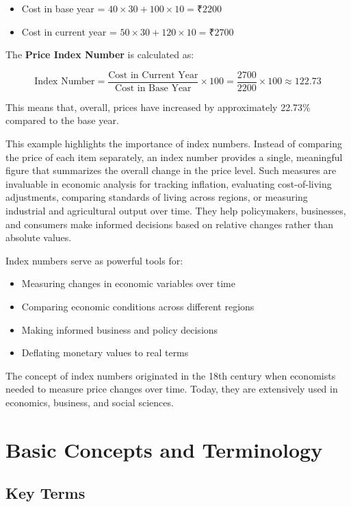 \documentclass[twoside]{book}
\begin{document}
\begin{itemize}
    \item Cost in base year = \( 40 \times 30 + 100 \times 10 = ₹2200 \)
    \item Cost in current year = \( 50 \times 30 + 120 \times 10 = ₹2700 \)
\end{itemize}

The \textbf{Price Index Number} is calculated as:

\[
\text{Index Number} = \frac{\text{Cost in Current Year}}{\text{Cost in Base Year}} \times 100 = \frac{2700}{2200} \times 100 \approx 122.73
\]

This means that, overall, prices have increased by approximately 22.73\% compared to the base year.

This example highlights the importance of index numbers. Instead of comparing the price of each item separately, an index number provides a single, meaningful figure that summarizes the overall change in the price level. Such measures are invaluable in economic analysis for tracking inflation, evaluating cost-of-living adjustments, comparing standards of living across regions, or measuring industrial and agricultural output over time. They help policymakers, businesses, and consumers make informed decisions based on relative changes rather than absolute values.

Index numbers serve as powerful tools for:
\begin{itemize}
    \item Measuring changes in economic variables over time
    \item Comparing economic conditions across different regions
    \item Making informed business and policy decisions
    \item Deflating monetary values to real terms
\end{itemize}

The concept of index numbers originated in the 18th century when economists needed to measure price changes over time. Today, they are extensively used in economics, business, and social sciences.

\section{Basic Concepts and Terminology}

\subsection{Key Terms}
\end{document}
